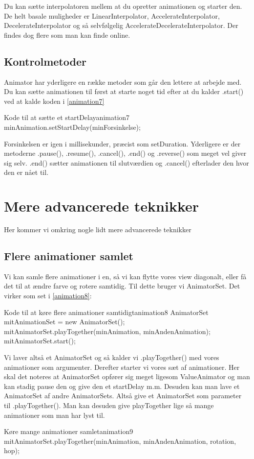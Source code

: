 Du kan sætte interpolatoren mellem at du opretter animationen og starter den.
De helt basale muligheder er LinearInterpolator, AccelerateInterpolator, DecelerateInterpolator og så selvfølgelig AccelerateDecelerateInterpolator. Der findes dog flere som man kan finde online.
\subsection{Kontrolmetoder}
Animator har yderligere en række metoder som går den lettere at arbejde med. Du kan sætte animationen til først at starte noget tid efter at du kalder .start() ved at kalde koden i \autoref{animation7} \\
\begin{JavaCode}{Kode til at sætte et startDelay}{animation7}
	minAnimation.setStartDelay(minForsinkelse);
\end{JavaCode}
Forsinkelsen er igen i millisekunder, præcist som setDuration. 
Yderligere er der metoderne .pause(), .resume(), .cancel(),  .end() og .reverse() som meget vel giver sig selv. .end() sætter animationen til slutværdien og .cancel() efterlader den hvor den er nået til.
\section{Mere advancerede teknikker}
Her kommer vi omkring nogle lidt mere advancerede teknikker
\subsection{Flere animationer samlet}
Vi kan samle flere animationer i en, så vi kan flytte vores view diagonalt, eller få det til at ændre farve og rotere samtidig. Til dette bruger vi AnimatorSet. Det virker som set i \autoref{animation8}:
\begin{JavaCode}{Kode til at køre flere animationer samtidigt}{animation8}
AnimatorSet mitAnimationSet = new AnimatorSet();
mitAnimatorSet.playTogether(minAnimation, minAndenAnimation);
mitAnimatorSet.start();
\end{JavaCode}
Vi laver altså et AnimatorSet og så kalder vi .playTogether() med vores animationer som argumenter. Derefter starter vi vores sæt af animationer. Her skal det noteres at AnimatorSet opfører sig meget ligesom ValueAnimator og man kan stadig pause den og give den et startDelay m.m. 
Desuden kan man lave et AnimatorSet af andre AnimatorSets. Altså give et AnimatorSet som parameter til .playTogether(). Man kan desuden give playTogether lige så mange animationer som man har lyst til.
\begin{JavaCode}{Køre mange animationer samlet}{animation9}
	mitAnimatorSet.playTogether(minAnimation, minAndenAnimation, rotation, hop);
\end{JavaCode}

